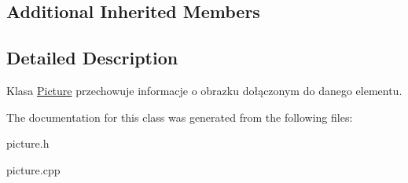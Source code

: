 \subsection*{Additional Inherited Members}


\subsection{Detailed Description}
Klasa \mbox{\hyperlink{class_picture}{Picture}} przechowuje informacje o obrazku dołączonym do danego elementu. 

The documentation for this class was generated from the following files\+:\begin{DoxyCompactItemize}
\item 
picture.\+h\item 
picture.\+cpp\end{DoxyCompactItemize}

